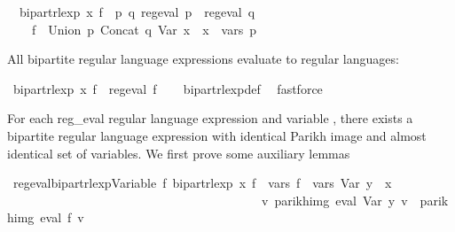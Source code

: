 \begin{isabellebody}
\ \ {\isachardoublequoteopen}bipart{\isacharunderscore}{\kern0pt}rlexp\ x\ f\ {\isasymequiv}\ {\isasymexists}p\ q{\isachardot}{\kern0pt}\ reg{\isacharunderscore}{\kern0pt}eval\ p\ {\isasymand}\ reg{\isacharunderscore}{\kern0pt}eval\ q\ {\isasymand}\isanewline
\ \ \ \ f\ {\isacharequal}{\kern0pt}\ Union\ p\ {\isacharparenleft}{\kern0pt}Concat\ q\ {\isacharparenleft}{\kern0pt}Var\ x{\isacharparenright}{\kern0pt}{\isacharparenright}{\kern0pt}\ {\isasymand}\ x\ {\isasymnotin}\ vars\ p{\isachardoublequoteclose}%
\begin{isamarkuptext}%
All bipartite regular language expressions evaluate to regular languages:%
\end{isamarkuptext}\isamarkuptrue%
\isamarkupfalse%
\ {\isachardoublequoteopen}bipart{\isacharunderscore}{\kern0pt}rlexp\ x\ f\ {\isasymLongrightarrow}\ reg{\isacharunderscore}{\kern0pt}eval\ f{\isachardoublequoteclose}\isanewline
%
\isadelimproof
\ \ %
\endisadelimproof
%
\isatagproof
{}\isamarkupfalse%
\ bipart{\isacharunderscore}{\kern0pt}rlexp{\isacharunderscore}{\kern0pt}def\ \isamarkupfalse%
\ fastforce%
\endisatagproof
{\isafoldproof}%
%
\isadelimproof
%
\endisadelimproof
%
\begin{isamarkuptext}%
For each reg_eval regular language expression and variable , there exists a bipartite
regular language expression with identical Parikh image and almost identical set of variables.
We first prove some auxiliary lemmas%
\end{isamarkuptext}\isamarkuptrue%
\isamarkupfalse%
\ reg{\isacharunderscore}{\kern0pt}eval{\isacharunderscore}{\kern0pt}bipart{\isacharunderscore}{\kern0pt}rlexp{\isacharunderscore}{\kern0pt}Variable{\isacharcolon}{\kern0pt}\ {\isachardoublequoteopen}{\isasymexists}f{\isacharprime}{\kern0pt}{\isachardot}{\kern0pt}\ bipart{\isacharunderscore}{\kern0pt}rlexp\ x\ f{\isacharprime}{\kern0pt}\ {\isasymand}\ vars\ f{\isacharprime}{\kern0pt}\ {\isacharequal}{\kern0pt}\ vars\ {\isacharparenleft}{\kern0pt}Var\ y{\isacharparenright}{\kern0pt}\ {\isasymunion}\ {\isacharbraceleft}{\kern0pt}x{\isacharbraceright}{\kern0pt}\isanewline
\ \ \ \ \ \ \ \ \ \ \ \ \ \ \ \ \ \ \ \ \ \ \ \ \ \ \ \ \ \ \ \ \ \ \ \ \ \ \ \ {\isasymand}\ {\isacharparenleft}{\kern0pt}{\isasymforall}v{\isachardot}{\kern0pt}\ parikh{\isacharunderscore}{\kern0pt}img\ {\isacharparenleft}{\kern0pt}eval\ {\isacharparenleft}{\kern0pt}Var\ y{\isacharparenright}{\kern0pt}\ v{\isacharparenright}{\kern0pt}\ {\isacharequal}{\kern0pt}\ parikh{\isacharunderscore}{\kern0pt}img\ {\isacharparenleft}{\kern0pt}eval\ f{\isacharprime}{\kern0pt}\ v{\isacharparenright}{\kern0pt}{\isacharparenright}{\kern0pt}{\isachardoublequoteclose}\isanewline

\end{isabellebody}
